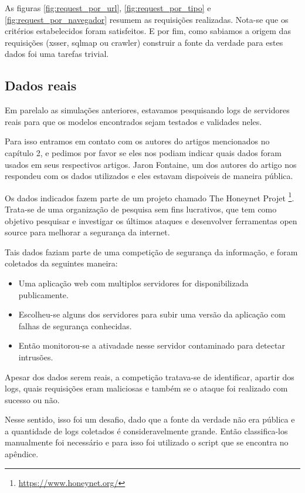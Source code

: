 As figuras \ref{fig:request_por_url}, \ref{fig:request_por_tipo} e \ref{fig:request_por_navegador} resumem 
as requisições realizadas. Nota-se que os critérios estabelecidos foram satisfeitos. E por fim, como 
sabiamos a origem das requisições (xsser, sqlmap ou crawler) construir a fonte da verdade para estes 
dados foi uma tarefas trivial.

\subsection{Dados reais}

Em parelalo as simulações anteriores, estavamos pesquisando logs de servidores reais para que os modelos 
encontrados sejam testados e validades neles. 

Para isso entramos em contato com os autores do artigos mencionados no capítulo 2, e 
pedimos por favor se eles nos podiam indicar quais dados foram usados em seus respectivos artigos. Jaron Fontaine, um dos autores
do artigo \cite{ref:art6} nos respondeu com os dados utilizados e eles estavam dispoiveis de
maneira pública. 

Os dados indicados fazem parte de um projeto chamado The Honeynet Projet \footnote{\url{https://www.honeynet.org/}}. Trata-se de uma organização de pesquisa 
sem fins lucrativos, que tem como objetivo pesquisar e investigar os últimos ataques e desenvolver
ferramentas open source para melhorar a segurança da internet.

Tais dados faziam parte de uma competição de segurança da informação, e foram coletados da seguintes maneira:

\begin{itemize}
    \item Uma aplicação web com multiplos servidores for disponibilizada publicamente.
    \item Escolheu-se alguns dos servidores para subir uma versão da aplicação 
    com falhas de segurança conhecidas.
    \item Então monitorou-se a ativadade nesse servidor contaminado para detectar intrusões.
\end{itemize}

Apesar dos dados serem reais, a competição tratava-se de identificar, apartir dos logs, quais requisições 
eram maliciosas e também se o ataque foi realizado com sucesso ou não. 

Nesse sentido, isso foi um desafio, dado que a fonte da verdade não era pública e a quantidade de logs 
coletados é consideravelmente grande. Então classifica-los manualmente foi necessário e para 
isso foi utilizado o script que se encontra no apêndice.

